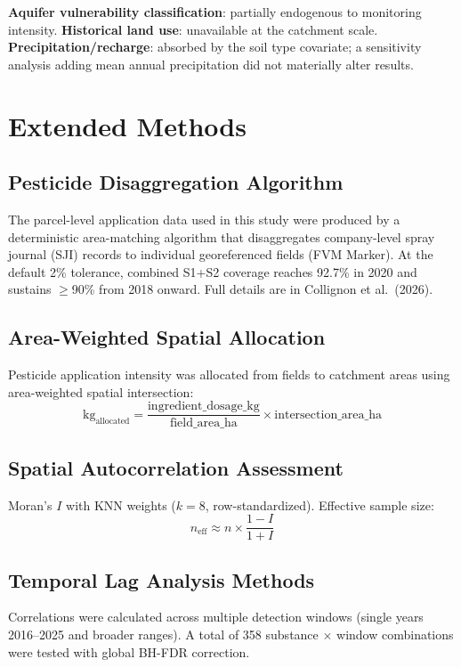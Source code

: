 \documentclass[12pt,a4paper]{article}
\begin{document}
\textbf{Aquifer vulnerability classification}: partially endogenous to monitoring intensity. \textbf{Historical land use}: unavailable at the catchment scale. \textbf{Precipitation/recharge}: absorbed by the soil type covariate; a sensitivity analysis adding mean annual precipitation did not materially alter results.

\section{Extended Methods}

\subsection{Pesticide Disaggregation Algorithm}

The parcel-level application data used in this study were produced by a deterministic area-matching algorithm that disaggregates company-level spray journal (SJI) records to individual georeferenced fields (FVM Marker). At the default 2\% tolerance, combined S1+S2 coverage reaches 92.7\% in 2020 and sustains $\geq$90\% from 2018 onward. Full details are in Collignon et al.\ (2026).

\subsection{Area-Weighted Spatial Allocation}

Pesticide application intensity was allocated from fields to catchment areas using area-weighted spatial intersection:
\[
\text{kg}_{\text{allocated}} = \frac{\text{ingredient\_dosage\_kg}}{\text{field\_area\_ha}} \times \text{intersection\_area\_ha}
\]

\subsection{Spatial Autocorrelation Assessment}

Moran's $I$ with KNN weights ($k = 8$, row-standardized). Effective sample size:
\[
n_{\text{eff}} \approx n \times \frac{1 - I}{1 + I}
\]

\subsection{Temporal Lag Analysis Methods}

Correlations were calculated across multiple detection windows (single years 2016--2025 and broader ranges). A total of 358 substance $\times$ window combinations were tested with global BH-FDR correction.
\end{document}
